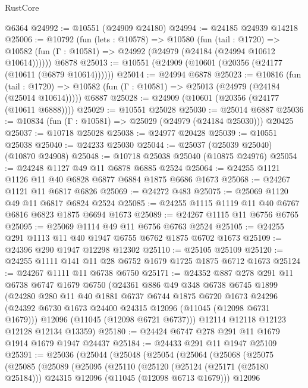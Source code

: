 \begin{lexlean}{RustCore}
\begin{coremodule}
    @6364
@24992 := @10551 (@24909 @24180)
@24994 := @24185 @24939 @14218
@25006 := @10792
    (fun (lets : @10578) =>
    @10580
      (fun (tail : @1720) =>
      @10582 (fun (Γ : @10581) => @24992 (@24979 (@24184 (@24994 @10612 @10614))))))
    @6878
@25013 := @10551 (@24909 (@10601 (@20356 (@24177 (@10611 (@6879 @10614))))))
@25014 := @24994 @6878
@25023 := @10816
    (fun (tail : @1720) => @10582 (fun (Γ : @10581) => @25013 (@24979 (@24184 (@25014 @10614)))))
    @6887
@25028 := @24909 (@10601 (@20356 (@24177 (@10611 @6888))))
@25029 := @10551 @25028
@25030 := @25014 @6887
@25036 := @10834 (fun (Γ : @10581) => @25029 (@24979 (@24184 @25030))) @20425
@25037 := @10718 @25028
@25038 := @24977 @20428
@25039 := @10551 @25038
@25040 := @24233 @25030
@25044 := @25037 (@25039 @25040) (@10870 @24908)
@25048 := @10718 @25038 @25040 (@10875 @24976)
@25054 := @24248 @1127 @49 @11 @6878 @6885 @2524
@25064 := @24255 @1121 @1126 @11 @40 @6828 @6877 @6884 @1875 @6686 @1673
@25068 := @24267 @1121 @11 @6817 @6826
@25069 := @24272 @483
@25075 := @25069 @1120 @49 @11 @6817 @6824 @2524
@25085 := @24255 @1115 @1119 @11 @40 @6767 @6816 @6823 @1875 @6694 @1673
@25089 := @24267 @1115 @11 @6756 @6765
@25095 := @25069 @1114 @49 @11 @6756 @6763 @2524
@25105 := @24255 @291 @1113 @11 @40 @1947 @6755 @6762 @1875 @6702 @1673
@25109 := @24396 @290 @1947 @12298 @12302
@25110 := @25105 @25109
@25120 := @24255 @1111 @141 @11 @28 @6752 @1679 @1725 @1875 @6712 @1673
@25124 := @24267 @1111 @11 @6738 @6750
@25171 := @24352
    @887
    @278
    @291
    @11
    @6738
    @6747
    @1679
    @6750
    (@24361
      @886
      @49
      @348
      @6738
      @6745
      @1899
      (@24280
        @280
        @11
        @40
        @1881
        @6737
        @6744
        @1875
        @6720
        @1673
        @24296
        (@24392 @6730 @1673 @24400 @24315 @12096 (@11045 (@12098 @6731 @1679)))
        @12096
        (@11045 (@12098 @6721 @6737)))
      @12114
      @12118
      @12123
      @12128
      @12134
      @13359)
@25180 := @24424 @6747 @278 @291 @11 @1679 @1914 @1679 @1947 @24437
@25184 := @24433 @291 @11 @1947 @25109
@25391 := @25036
    (@25044
      (@25048
        (@25054
          (@25064
            (@25068
              (@25075
                (@25085
                  (@25089
                    (@25095
                      (@25110
                        (@25120
                          (@25124 (@25171 (@25180 @25184)))
                          @24315
                          @12096
                          (@11045 (@12098 @6713 @1679)))
                        @12096

\end{coremodule}
\end{lexlean}
